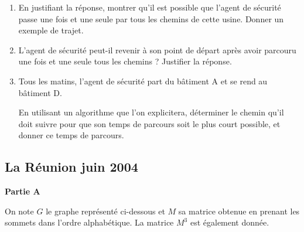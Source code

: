 \begin{enumerate}
\item En justifiant la réponse, montrer qu'il est possible que l'agent de sécurité passe une fois et une seule par tous les chemins de cette usine. Donner un exemple de trajet.

\item L'agent de sécurité peut-il revenir à son point de départ après avoir parcouru une fois et une seule tous les chemins ? Justifier la réponse.

\item Tous les matins, l'agent de sécurité part du bâtiment A et se rend au bâtiment D.

En utilisant un algorithme que l'on explicitera, déterminer le chemin qu'il doit suivre pour que son temps de parcours soit le plus court possible, et donner ce temps de parcours.
\end{enumerate}

\medskip
\begin{tkzexample}
\end{tkzexample}
\vfill\newpage

\subsection{La Réunion juin 2004 }\label{larj04} 


\textbf{Partie A}

On note $G$ le graphe représenté ci-dessous et $M$ sa matrice obtenue en prenant les sommets dans l'ordre alphabétique. La matrice $M^3$ est également donnée.

\medskip
\begin{center}
\end{center}

